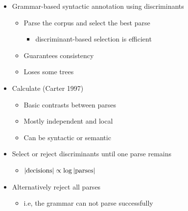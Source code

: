 \documentclass[a4paper,landscape,headrule,footrule,xetex]{foils}
\begin{document}
\begin{itemize}
\item Grammar-based syntactic annotation using discriminants
  \begin{itemize}
  \item Parse the corpus and select the best parse
    \begin{itemize}
    \item discriminant-based selection is efficient
    \end{itemize}
  \item Guarantees consistency
  \item Loses some trees
  \end{itemize}
\end{itemize}
\begin{itemize}
\item Calculate  (Carter 1997)
  \begin{itemize}
  \item Basic contrasts between parses
  \item Mostly independent and local
  \item Can be syntactic or semantic
  \end{itemize}
\item Select or reject discriminants until one parse remains
  \begin{itemize}
  \item $|{\textnormal{decisions}| \propto \log |\textnormal{parses}|}$
  \end{itemize}
\item Alternatively reject all parses
  \begin{itemize}
  \item i.e, the grammar can not parse successfully
  \end{itemize}
\end{itemize}



\end{document}
